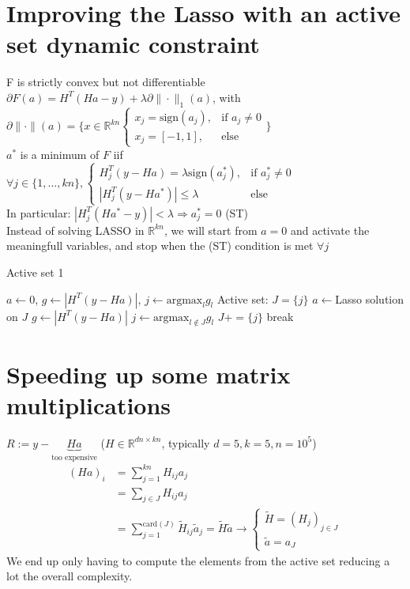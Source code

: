 \documentclass{report}
\begin{document}
		\section{Improving the Lasso with an active set dynamic constraint}
			F is strictly convex but not differentiable\\
			$\partial F(a)=H^T(Ha-y)+\lambda\partial\|\cdot\|_1(a)$, with $\partial\|\cdot\|(a)=\{x\in\mathbb{R}^{kn}\begin{cases}x_j=\text{sign}(a_j),&\text{if }a_j\neq 0\\x_j=[-1,1],&\text{else}\end{cases}\}$\\
			$a^*$ is a minimum of $F$ iif $\forall j\in\{1,\dots,kn\},\begin{cases}H_j^T(y-Ha)=\lambda\text{sign}(a_j^*),&\text{if }a_j^*\neq 0\\|H_j^T(y-Ha^*)|\leq\lambda&\text{else}\end{cases}$\\
			In particular: $|H_j^T(Ha^*-y)|<\lambda\Rightarrow a_j^*=0$ (ST)\\
			Instead of solving LASSO in $\mathbb{R}^{kn}$, we will start from $a=0$ and activate the meaningfull variables, and stop when the (ST) condition is met $\forall j$
			\begin{algorithm}[h]
				\caption{Active set 1}
				\begin{algorithmic}
					\State $a\gets 0$, $g\gets|H^T(y-Ha)|$, $j\gets\text{argmax}_l g_l$
					\State Active set: $J=\{j\}$
						\State $a\gets$Lasso solution on $J$
						\State $g\gets|H^T(y-Ha)|$
						\State $j\gets\text{argmax}_{l\notin J}g_l$
							\State $J+=\{j\}$
						\Else
							\State break
						\EndIf
					\EndWhile
				\end{algorithmic}
			\end{algorithm}

		\section{Speeding up some matrix multiplications}
			$R:=y-\underbrace{Ha}_{\text{too expensive}}$ ($H\in\mathbb{R}^{dn\times kn}$, typically $d=5, k=5, n=10^5$)\\
			\begin{align*}
				(Ha)_i	&=\sum_{j=1}^{kn}H_{ij}a_j\\
						&=\sum_{j\in J}H_{ij}a_j\\
						&=\sum_{j=1}^{\text{card}(J)}\widetilde H_{ij}\widetilde a_j=\widetilde H\widetilde a\rightarrow\begin{cases}\widetilde H=(H_j)_{j\in J}\\\widetilde a=a_J\end{cases}
			\end{align*}
			We end up only having to compute the elements from the active set reducing a lot the overall complexity.
\end{document}
